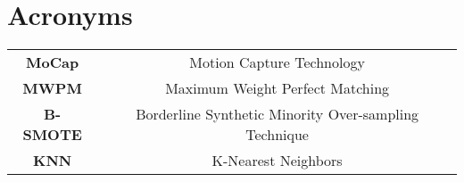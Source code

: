 \section*{\Huge Acronyms}



\begin{table}[H]
    \begin{tabular}{c c}
        \textbf{MoCap} & Motion Capture Technology \\
        \textbf{MWPM} & Maximum Weight Perfect Matching \\
        \textbf{B-SMOTE} & Borderline Synthetic Minority Over-sampling Technique \\
        \textbf{KNN} & K-Nearest Neighbors \\
    \end{tabular}
\end{table}